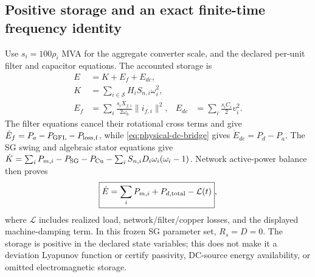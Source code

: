 \documentclass[11pt]{article}
\begin{document}
\subsection{Positive storage and an exact finite-time frequency identity}
Use $s_i=100\rho_i$ MVA for the aggregate converter scale, and the declared
per-unit filter and capacitor equations. The accounted storage is
\begin{align}
 E&=K+E_f+E_{dc},\nonumber\\
 K&=\sum_{i\in\mathcal S}H_iS_{n,i}\omega_i^2,\nonumber\\
 E_f&=\sum_i\frac{s_iX_{f,i}}{2\omega_b}\|i_{f,i}\|^2,
 &E_{dc}&=\sum_i\frac{s_iC_i}{2}v_i^2.
 \label{eq:bridge-storage}
\end{align}
The filter equations cancel their rotational cross terms and give
$\dot E_f=P_a-P_{\rm GFL}-P_{\rm loss,f}$, while
\eqref{eq:physical-dc-bridge} gives $\dot E_{dc}=P_d-P_a$.
The SG swing and algebraic stator equations give
$\dot K=\sum_i P_{m,i}-P_{\rm SG}-P_{\rm Cu}
-\sum_iS_{n,i}D_i\omega_i(\omega_i-1)$.
Network active-power balance then proves
\begin{equation}
 \boxed{\dot E=\sum_iP_{m,i}+P_{d,\rm total}-\mathcal L(t)},
 \label{eq:bridge-energy}
\end{equation}
where $\mathcal L$ includes realized load, network/filter/copper losses,
and the displayed machine-damping term. In this frozen SG parameter set,
$R_s=D=0$. The storage is positive in the declared state variables; this
does not make it a deviation Lyapunov function or certify passivity, DC-source
energy availability, or omitted electromagnetic storage.
\end{document}
